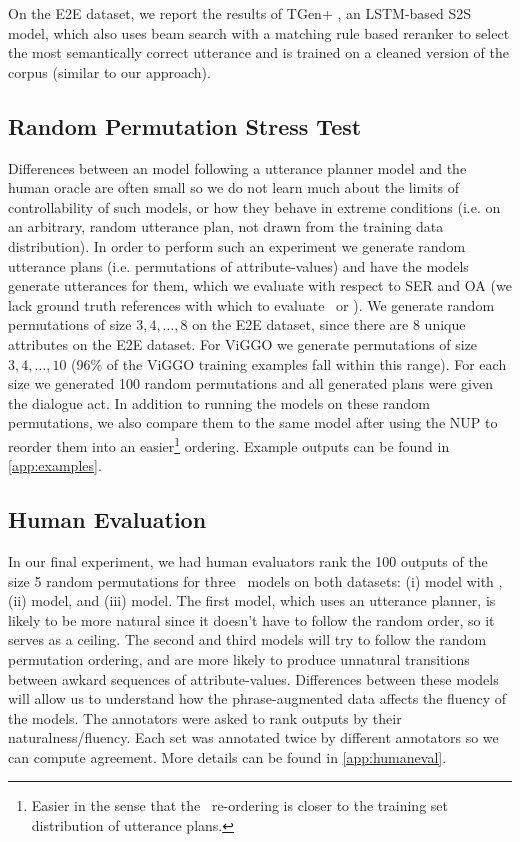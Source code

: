 On the E2E dataset, we report the results of 
TGen+ \cite{dusek2019}, an
LSTM-based S2S model, which also uses beam search with a matching rule based
reranker to select the most semantically correct utterance and is
trained on a cleaned version of the corpus (similar to our approach).
   
\subsection{Random Permutation Stress Test}



Differences between an  model following a utterance planner model
and the human oracle are often small so we do not learn much about the limits
of controllability of such models, or how they behave in extreme conditions
(i.e. on an arbitrary, random utterance plan, not drawn from the training data
distribution). In order to perform such an experiment we generate random
utterance plans (i.e. permutations of attribute-values) and have the
 models generate utterances for them, which we evaluate with
respect to SER and OA (we lack ground truth references with which to evaluate
\bleu~or \rougel).  We generate random permutations of size $3,4,\ldots, 8$ on
the E2E dataset, since there are 8 unique attributes on the E2E dataset. For
ViGGO we generate permutations of size $3,4,\ldots,10$ (96\% of the ViGGO
training examples fall within this range). For each size we generated 100
random permutations and all generated plans were given the 
dialogue act. In addition to running the  models on these random
permutations, we also compare them to the same model after using the NUP  to
reorder them into an easier\footnote{Easier in the sense that the
\NUP~re-ordering is closer to the training set distribution of 
utterance plans.} ordering.  Example outputs can be
found in \autoref{app:examples}.  



\subsection{Human Evaluation} In our final experiment, we had human evaluators
rank the 100 outputs of the size 5 random permutations for three \BART~models
on both datasets: (i)  model with \NUP,  (ii) 
model, and (iii)  model.  The first model, which uses an utterance
planner, is likely to be more natural since it doesn't have to follow the
random order, so it serves as a ceiling.  The second and third models will try
to follow the random permutation ordering, and are more likely to produce
unnatural transitions between awkard sequences of attribute-values.
Differences between these models will allow us to understand how the
phrase-augmented data affects the fluency of the models.  The annotators were
asked to rank outputs by their naturalness/fluency.  Each set was annotated
twice by different annotators so we can compute agreement. More details can be
found in \autoref{app:humaneval}.



